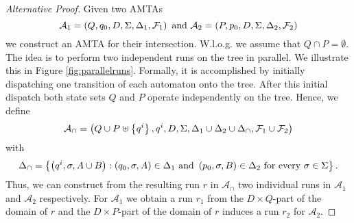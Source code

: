 \begin{proof}[Alternative Proof]
  Given two \acp{AMTA}
  \begin{equation*}
    \mathcal{A}_{1} = \left(Q, q_{0}, D, \Sigma, \Delta_{1}, \mathcal{F}_{1}\right)
      \text{ and }
    \mathcal{A}_{2} = \left(P, p_{0}, D, \Sigma, \Delta_{2}, \mathcal{F}_{2}\right)
  \end{equation*}
  we construct an \ac{AMTA} for their intersection. W.l.o.g. we assume that 
  $Q\cap P = \emptyset$. The idea is to perform two independent runs on the 
  tree in parallel. We illustrate this in Figure \ref{fig:parallelruns}. 
  Formally, it is accomplished by initially dispatching one transition of each 
  automaton onto the tree. After this initial dispatch both state sets $Q$ and
  $P$ operate independently on the tree. Hence, we define
  \begin{equation*}
    \mathcal{A}_{\cap} = \left(
      Q\cup P\uplus\left\{q^{i}\right\}, q^{i}, D, \Sigma, 
      \Delta_{1}\cup\Delta_{2}\cup\Delta_{\cap}, 
      \mathcal{F}_{1}\cup\mathcal{F}_{2}
    \right)
  \end{equation*}
  with
  \begin{equation*}
    \Delta_{\cap} = \left\{
      \left(q^{i},\sigma,A\cup B\right):
        \left(q_{0},\sigma,A\right)\in\Delta_{1}
      \text{ and }
        \left(p_{0},\sigma,B\right)\in\Delta_{2}
      \text{ for every }
        \sigma\in\Sigma
    \right\}.
  \end{equation*}
  Thus, we can construct from the resulting run $r$ in $\mathcal{A}_{\cap}$ two
  individual runs in $\mathcal{A}_{1}$ and $\mathcal{A}_{2}$ respectively. For
  $\mathcal{A}_{1}$ we obtain a run $r_{1}$ from the $D\times Q$-part of the
  domain of $r$ and the $D\times P$-part of the domain of $r$ induces a run
  $r_{2}$ for $\mathcal{A}_{2}$.
\end{proof}


